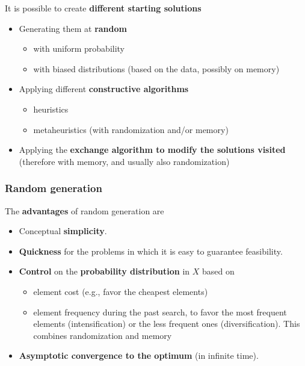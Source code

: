 It is possible to create \textbf{different starting solutions}
\begin{itemize}
	\item Generating them at \textbf{random}
	\begin{itemize}
		\item with uniform probability
		\item with biased distributions (based on the data, possibly on memory)
	\end{itemize}
	\nn
	
	\item Applying different \textbf{constructive algorithms}
	\begin{itemize}
		\item heuristics
		\item metaheuristics (with randomization and/or memory)
	\end{itemize}
	\nn
	
	\item Applying the \textbf{exchange algorithm to modify the solutions visited} (therefore with memory, and usually also randomization)
\end{itemize}

\newpage

\subsubsection{Random generation}

The \textbf{advantages} of random generation are
\begin{itemize}
	\item Conceptual \textbf{simplicity}.\\
	
	\item \textbf{Quickness} for the problems in which it is easy to guarantee feasibility.\\
	
	\item \textbf{Control} on the \textbf{probability distribution} in $X$ based on
	\begin{itemize}
		\item element cost (e.g., favor the cheapest elements)
		
		\item element frequency during the past search, to favor the most frequent elements (intensification) or the less frequent ones (diversification). This combines randomization and memory
	\end{itemize}
	\nn
	
	\item \textbf{Asymptotic convergence to the optimum} (in infinite time).\\
\end{itemize}


